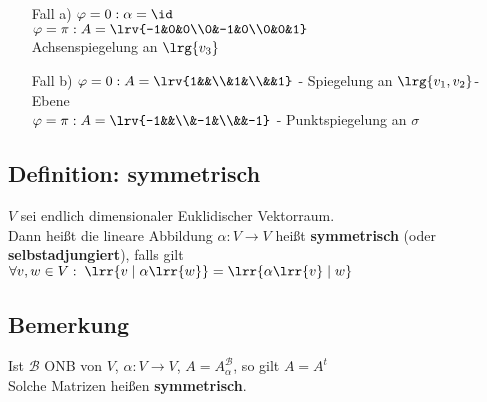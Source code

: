 	\begin{enumerate}[a)]
		\item[Fall a)] $\varphi=0 : \alpha=\id$\\
			$\varphi=\pi: A=\lrv{-1&0&0\\0&-1&0\\0&0&1}$\\
			Achsenspiegelung an $\lrg{v_3}$
		\item[Fall b)] $\varphi=0 : A=\lrv{1&&\\&1&\\&&1}$ - Spiegelung an $\lrg{v_1,v_2}$-Ebene\\
			$\varphi=\pi : A=\lrv{-1&&\\&-1&\\&&-1}$ - Punktspiegelung an $\sigma$
	\end{enumerate}

\subsection{Definition: symmetrisch}
	$V$ sei endlich dimensionaler Euklidischer Vektorraum.\\
	Dann heißt die lineare Abbildung $\alpha:V\rightarrow V$ heißt \textbf{symmetrisch} (oder \textbf{selbstadjungiert}), falls gilt $\forall v,w\in V:\;\lrr{v\mid\alpha\lrr{w}}=\lrr{\alpha\lrr{v}\mid w}$

\subsection{Bemerkung}
	Ist $\mathcal{B}$ ONB von $V$, $\alpha:V\rightarrow V$, $A=A_\alpha^{\mathcal{B}}$, so gilt $A=A^t$\\
	Solche Matrizen heißen \textbf{symmetrisch}.

